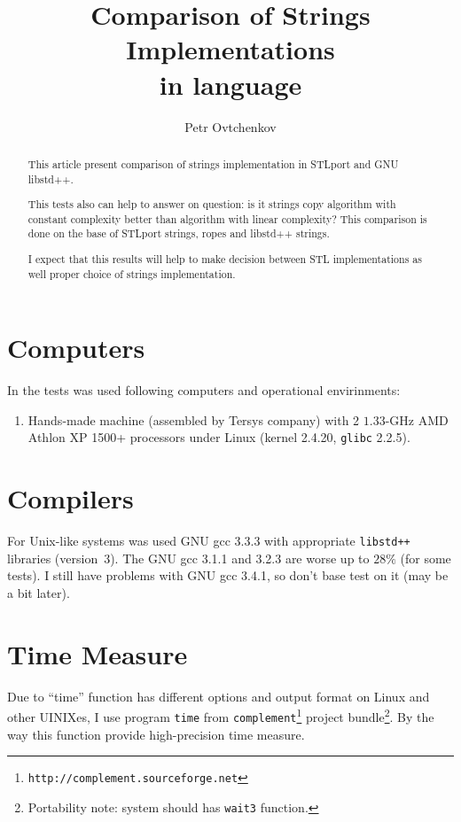 \documentclass[a4paper]{article}
\title{Comparison of Strings Implementations \\ in \CPP{} language}
\author{Petr Ovtchenkov}
\providecommand{\STLport}{{\fontfamily{cmss}\selectfont STLport}}
\providecommand{\libstd}{{\fontfamily{cmtt}\selectfont GNU \mbox{libstd++}}}
\begin{document}
\maketitle

\begin{abstract}
This article present comparison of 
strings implementation in \STLport{} and \libstd.

This tests also can help to answer on question:
is it strings copy algorithm with constant complexity
better than algorithm with linear complexity?
This comparison is done on the base of STLport strings, ropes
and libstd++ strings.

I expect that this results will help to make decision between
STL implementations as well proper choice of strings implementation.
\end{abstract}

\section{Computers}

In the tests was used following computers and operational envirinments:
\begin{enumerate}
  \item Hands-made machine (assembled by Tersys company) with 2 $1.33$-GHz
        AMD Athlon XP 1500+ processors under Linux (kernel 2.4.20, \verb|glibc| 2{.}2{.}5).
\end{enumerate}

\section{Compilers}

For Unix-like systems was used GNU gcc 3{.}3{.}3 %
with appropriate
\verb|libstd++| libraries (version~3).
The GNU gcc 3{.}1{.}1 and 3{.}2{.}3 are worse up to $28\%$ (for some
tests).
I still have problems with GNU gcc 3{.}4{.}1, so don't base test on it
(may be a bit later).

\section{Time Measure\label{timemeasure}}

Due to ``time'' function has different options and output format on Linux
and other UINIXes, I use program \texttt{time} from
\texttt{complement}\footnote{\texttt{http://complement.sourceforge.net}}
project bundle\footnote{Portability note: system should has \texttt{wait3} function.}.
By the way this function provide high-precision time measure.
\end{document}
